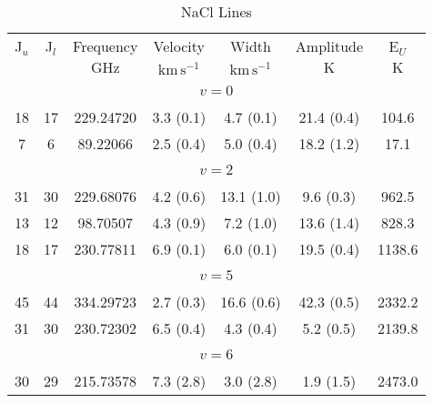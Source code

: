 \begin{table*}[htp]
\centering
\caption{NaCl Lines}
\begin{tabular}{ccccccc}
\label{tab:NaCl_salt_lines}
 J$_u$ & J$_l$ & Frequency & Velocity & Width & Amplitude & E$_U$ \\
  &  & $\mathrm{GHz}$ & $\mathrm{km\,s^{-1}}$ & $\mathrm{km\,s^{-1}}$ & $\mathrm{K}$ & $\mathrm{K}$ \\
\hline
&\vspace{-0.75em}\\
\multicolumn{7}{c}{$v = 0$} \\
\vspace{-0.75em}\\
 18 & 17 & 229.24720 & 3.3 (0.1) & 4.7 (0.1) & 21.4 (0.4) & 104.6 \\
 7 & 6 & 89.22066 & 2.5 (0.4) & 5.0 (0.4) & 18.2 (1.2) & 17.1 \\
&\vspace{-0.75em}\\
\multicolumn{7}{c}{$v = 2$} \\
\vspace{-0.75em}\\
 31 & 30 & 229.68076 & 4.2 (0.6) & 13.1 (1.0) & 9.6 (0.3) & 962.5 \\
 13 & 12 & 98.70507 & 4.3 (0.9) & 7.2 (1.0) & 13.6 (1.4) & 828.3 \\
 18 & 17 & 230.77811 & 6.9 (0.1) & 6.0 (0.1) & 19.5 (0.4) & 1138.6 \\
&\vspace{-0.75em}\\
\multicolumn{7}{c}{$v = 5$} \\
\vspace{-0.75em}\\
 45 & 44 & 334.29723 & 2.7 (0.3) & 16.6 (0.6) & 42.3 (0.5) & 2332.2 \\
 31 & 30 & 230.72302 & 6.5 (0.4) & 4.3 (0.4) & 5.2 (0.5) & 2139.8 \\
&\vspace{-0.75em}\\
\multicolumn{7}{c}{$v = 6$} \\
\vspace{-0.75em}\\
 30 & 29 & 215.73578 & 7.3 (2.8) & 3.0 (2.8) & 1.9 (1.5) & 2473.0 \\
\hline
\end{tabular}

\par 
\end{table*}
